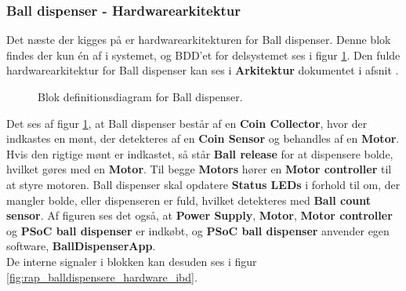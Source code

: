 \documentclass[Rapport/Rapport_main.tex]{subfiles}
\begin{document}
\subsubsection{Ball dispenser - Hardwarearkitektur}
Det næste der kigges på er hardwarearkitekturen for Ball dispenser. Denne blok findes der kun én af i systemet, og BDD'et for delsystemet ses i figur \ref{fig:rap_balldispenser_hardware_bdd}. Den fulde hardwarearkitektur for Ball dispenser kan ses i \textbf{Arkitektur} dokumentet i afsnit .
\begin{figure}[H]
    \centering
    \caption{Blok definitionsdiagram for Ball dispenser.}
    \label{fig:rap_balldispenser_hardware_bdd}
\end{figure}
Det ses af figur \ref{fig:rap_balldispenser_hardware_bdd}, at Ball dispenser består af en \textbf{Coin Collector}, hvor der indkastes en mønt, der detekteres af en \textbf{Coin Sensor} og behandles af en \textbf{Motor}. Hvis den rigtige mønt er indkastet, så står \textbf{Ball release} for at dispensere bolde, hvilket gøres med en  \textbf{Motor}. Til begge \textbf{Motors} hører en \textbf{Motor controller} til at styre motoren. Ball dispenser skal opdatere \textbf{Status LEDs} i forhold til om, der mangler bolde, eller dispenseren er fuld, hvilket detekteres med \textbf{Ball count sensor}. Af figuren ses det også, at \textbf{Power Supply}, \textbf{Motor}, \textbf{Motor controller} og \textbf{PSoC ball dispenser} er indkøbt, og \textbf{PSoC ball dispenser} anvender egen software, \textbf{BallDispenserApp}.\\
De interne signaler i blokken kan desuden ses i figur \ref{fig:rap_balldispensere_hardware_ibd}.
\end{document}
